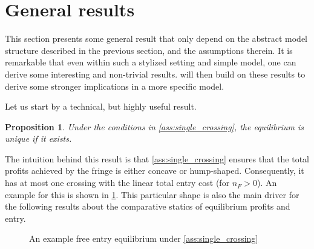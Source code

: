 \documentclass[a4paper]{article}
\newtheorem{proposition}{Proposition}
\begin{document}
\section{General results}

This section presents some general result that only depend on the abstract model structure described in the previous section, and the assumptions therein.
It is remarkable that even within such a stylized setting and simple model, one can derive some interesting and non-trivial results.
 will then build on these results to derive some stronger implications in a more specific model.

Let us start by a technical, but highly useful result.
\begin{proposition}
    \label{prop:unique_equilibrium}
    Under the conditions in \cref{ass:single_crossing}, the equilibrium is unique if it exists.
\end{proposition}
The intuition behind this result is that \cref{ass:single_crossing} ensures that the total profits achieved by the fringe is either concave or hump-shaped.
Consequently, it has at most one crossing with the linear total entry cost (for $n_F > 0$).
An example for this is shown in \cref{fig:equilibrium}.
This particular shape is also the main driver for the following results about the comparative statics of equilibrium profits and entry.

\begin{figure}[ht]
    \centering
    \caption{An example free entry equilibrium under \cref{ass:single_crossing}}
    \label{fig:equilibrium}
\end{figure}
\end{document}
